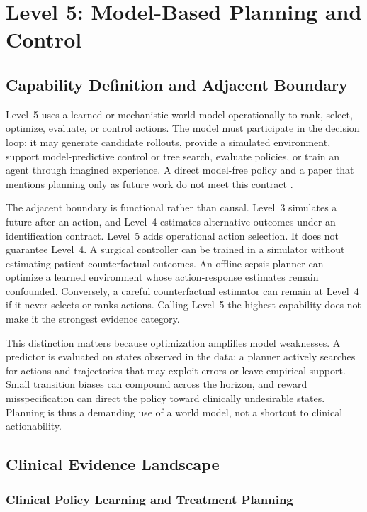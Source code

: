 \section{Level 5: Model-Based Planning and Control}
\label{sec:level5}

\subsection{Capability Definition and Adjacent Boundary}

Level~5 uses a learned or mechanistic world model operationally to rank, select, optimize, evaluate, or control actions. The model must participate in the decision loop: it may generate candidate rollouts, provide a simulated environment, support model-predictive control or tree search, evaluate policies, or train an agent through imagined experience. A direct model-free policy and a paper that mentions planning only as future work do not meet this contract \citep{SuttonBarto2018Reinforcement}.

The adjacent boundary is functional rather than causal. Level~3 simulates a future after an action, and Level~4 estimates alternative outcomes under an identification contract. Level~5 adds operational action selection. It does not guarantee Level~4. A surgical controller can be trained in a simulator without estimating patient counterfactual outcomes. An offline sepsis planner can optimize a learned environment whose action-response estimates remain confounded. Conversely, a careful counterfactual estimator can remain at Level~4 if it never selects or ranks actions. Calling Level~5 the highest capability does not make it the strongest evidence category.

This distinction matters because optimization amplifies model weaknesses. A predictor is evaluated on states observed in the data; a planner actively searches for actions and trajectories that may exploit errors or leave empirical support. Small transition biases can compound across the horizon, and reward misspecification can direct the policy toward clinically undesirable states. Planning is thus a demanding use of a world model, not a shortcut to clinical actionability.

\subsection{Clinical Evidence Landscape}

\subsubsection{Clinical Policy Learning and Treatment Planning}

